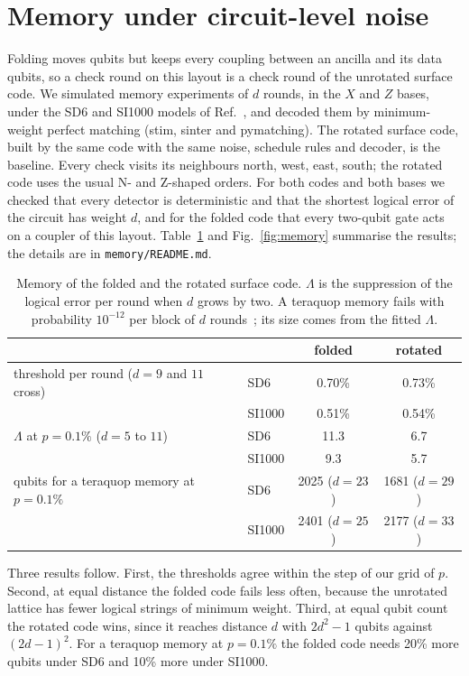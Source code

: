 \documentclass[11pt,a4paper]{article}
\begin{document}
\section{Memory under circuit-level noise}
\label{sec:memory}

Folding moves qubits but keeps every coupling between an ancilla and its data qubits, so a check
round on this layout is a check round of the unrotated surface code. We simulated memory
experiments of $d$ rounds, in the $X$ and $Z$ bases, under the SD6 and SI1000 models of
Ref.~\cite{Gidney2021}, and decoded them by minimum-weight perfect matching (stim, sinter and
pymatching). The rotated surface code, built by the same code with the same noise, schedule rules
and decoder, is the baseline. Every check visits its neighbours north, west, east, south; the rotated
code uses the usual N- and Z-shaped orders. For both codes and both bases we checked that every
detector is deterministic and that the shortest logical error of the circuit has weight $d$, and for
the folded code that every two-qubit gate acts on a coupler of this layout.
Table~\ref{tab:memory} and Fig.~\ref{fig:memory} summarise the results; the details are in
\texttt{memory/README.md}.

\begin{table}[!ht]
\centering
\begin{tabular}{@{}llcc@{}}
\toprule
 & & folded & rotated\\
\midrule
threshold per round ($d=9$ and $11$ cross) & SD6 & 0.70\% & 0.73\%\\
 & SI1000 & 0.51\% & 0.54\%\\
$\Lambda$ at $p=0.1\%$ ($d=5$ to $11$) & SD6 & 11.3 & 6.7\\
 & SI1000 & 9.3 & 5.7\\
qubits for a teraquop memory at $p=0.1\%$ & SD6 & 2025 ($d=23$) & 1681 ($d=29$)\\
 & SI1000 & 2401 ($d=25$) & 2177 ($d=33$)\\
\bottomrule
\end{tabular}
\caption{Memory of the folded and the rotated surface code. $\Lambda$ is the suppression of the
logical error per round when $d$ grows by two. A teraquop memory fails with probability
$10^{-12}$ per block of $d$ rounds~\cite{Gidney2021}; its size comes from the fitted $\Lambda$.}
\label{tab:memory}
\end{table}

Three results follow. First, the thresholds agree within the step of our grid of $p$. Second, at
equal distance the folded code fails less often, because the unrotated lattice has fewer logical
strings of minimum weight. Third, at equal qubit count the rotated code wins, since it reaches
distance $d$ with $2d^2-1$ qubits against $(2d-1)^2$. For a teraquop memory at $p=0.1\%$ the
folded code needs 20\% more qubits under SD6 and 10\% more under SI1000.
\end{document}
